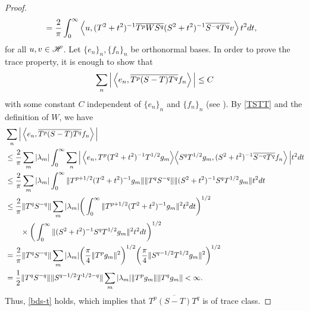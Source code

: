 \documentclass[12pt]{article}
\theoremstyle{plain}
\numberwithin{equation}{section}
\theoremstyle{remark}
\begin{document}
\begin{proof}
\begin{align}
& = \frac{2}{\pi} \int_0^\infty \left\langle u,(T^2+t^2)^{-1} \overline{T^{p} W S^{q}} (S^2+t^2)^{-1} \overline{S^{-q}T^q}v\right\rangle t^2dt,\label{TSTT}
\end{align}
for all $u,v\in\mathscr{H}$.
Let $\{e_n\}_n, \{f_n\}_n$ be orthonormal bases. In order to prove 
the trace property, it is enough to show that 
\begin{align}
  \sum_{n} \Big| \left\langle e_n,\overline{T^p(S-T)T^q}f_n\right\rangle \Big| \leq C \label{bds-t}
\end{align}
with some constant $C$ independent of $\{e_n\}_n$ and $\{f_n\}_n$ (see \cite[Proposition 3.6.5]{Si15}).
By \eqref{TSTT} and the definition of $W$, we have
\begin{align*}
& \sum_{n} \Big| \left\langle e_n,\overline{T^p(S-T)T^q}f_n\right\rangle \Big| \\
&\leq \frac{2}{\pi} \sum_{m} | \lambda_m | \int_0^\infty  \sum_{n} \Big| \left\langle e_n,T^p(T^2+t^2)^{-1}T^{1/2}g_m\right\rangle \! \left\langle S^qT^{1/2}g_m,(S^2+t^2)^{-1}\overline{S^{-q}T^q}f_n\right\rangle \Big| t^2 dt \\
&\leq \frac{2}{\pi} \sum_{m} | \lambda_m | \int_0^\infty \| T^{p+1/2}(T^2+t^2)^{-1} g_m \| \| T^qS^{-q} \| \| (S^2+t^2)^{-1}S^qT^{1/2}g_m \| t^2 dt \\
&\leq \frac{2}{\pi} \| T^qS^{-q} \| \sum_{m} | \lambda_m | \bigg( \int_0^\infty  \| T^{p+1/2}(T^2+t^2)^{-1} g_m \|^2 t^2dt \bigg)^{1/2} \\
&\qquad \times      \bigg( \int_0^\infty \| (S^2+t^2)^{-1}S^q T^{1/2}g_m \|^2 t^2 dt  \bigg)^{1/2} \\
&= \frac{2}{\pi} \| T^qS^{-q} \| \sum_{m} | \lambda_m | \bigg( \frac{\pi}{4}\| T^pg_m \|^2  \bigg)^{1/2} \bigg( \frac{\pi}{4} \| S^{q-1/2}T^{1/2}g_m \|^2 \bigg)^{1/2} \\
&= \frac{1}{2} \| T^qS^{-q} \| \| S^{q-1/2}T^{1/2-q} \| \sum_{m} | \lambda_m | \| T^pg_m \| \| T^qg_m \|  < \infty.
\end{align*}
Thus, \eqref{bds-t} holds, which implies that $\overline{T^p(S-T)T^q}$ is of trace class.
\end{proof}
\end{document}
